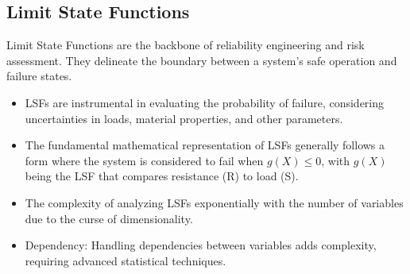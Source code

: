 


\subsection*{Limit State Functions}
Limit State Functions are the backbone of reliability engineering and risk assessment. They delineate the boundary between a system's safe operation and failure states.

\begin{itemize}
    \item LSFs are instrumental in evaluating the probability of failure, considering uncertainties in loads, material properties, and other parameters.
    \item The fundamental mathematical representation of LSFs generally follows a form where the system is considered to fail when \( g(X) \leq 0 \), with \( g(X) \) being the LSF that compares resistance (R) to load (S).
    \item The complexity of analyzing LSFs exponentially with the number of variables due to the curse of dimensionality.
    \item Dependency: Handling dependencies between variables adds complexity, requiring advanced statistical techniques.
\end{itemize}


